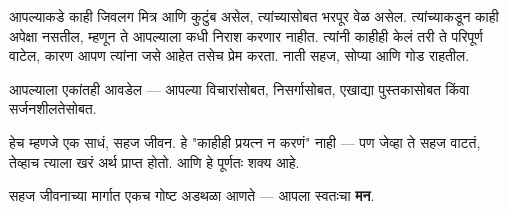 आपल्याकडे काही जिवलग मित्र आणि कुटुंब असेल, त्यांच्यासोबत भरपूर वेळ असेल.  
त्यांच्याकडून काही अपेक्षा नसतील, म्हणून ते आपल्याला कधी निराश करणार नाहीत.  
त्यांनी काहीही केलं तरी ते परिपूर्ण वाटेल, कारण आपण त्यांना जसे आहेत तसेच प्रेम करता.  
नाती सहज, सोप्या आणि गोड राहतील.  

आपल्याला एकांतही आवडेल — आपल्या विचारांसोबत, निसर्गासोबत, एखाद्या पुस्तकासोबत किंवा सर्जनशीलतेसोबत.  

हेच म्हणजे एक साधं, सहज जीवन.  
हे "काहीही प्रयत्न न करणं" नाही — पण जेव्हा ते सहज वाटतं, तेव्हाच त्याला खरं अर्थ प्राप्त होतो.  
आणि हे पूर्णतः शक्य आहे.  

सहज जीवनाच्या मार्गात एकच गोष्ट अडथळा आणते —  
आपला स्वतःचा \textbf{मन}.  
